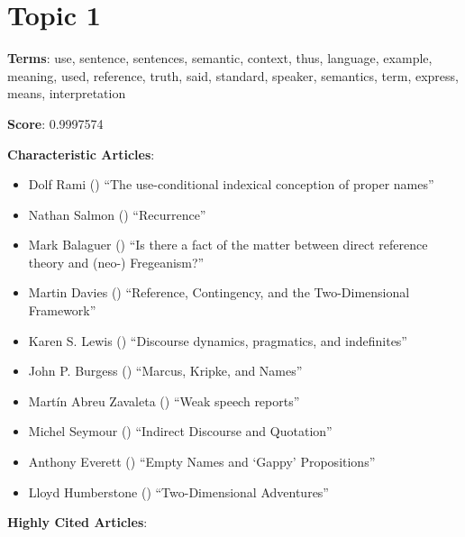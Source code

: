\documentclass[
  10pt,
  letterpaper,
  DIV=11,
  numbers=noendperiod,
  twoside]{scrartcl}
\providecommand{\tightlist}{%
  \setlength{\itemsep}{0pt}\setlength{\parskip}{0pt}}\usepackage{longtable,booktabs,array}
\begin{document}
\section{Topic 1}\label{topic-1}

\textbf{Terms}: use, sentence, sentences, semantic, context, thus,
language, example, meaning, used, reference, truth, said, standard,
speaker, semantics, term, express, means, interpretation

\textbf{Score}: 0.9997574

\textbf{Characteristic Articles}:

\begin{itemize}
\tightlist
\item
  Dolf Rami () ``The
  use-conditional indexical conception of proper names''
\item
  Nathan Salmon () ``Recurrence''
\item
  Mark Balaguer () ``Is there a
  fact of the matter between direct reference theory and (neo-)
  Fregeanism?''
\item
  Martin Davies () ``Reference,
  Contingency, and the Two-Dimensional Framework''
\item
  Karen S. Lewis () ``Discourse
  dynamics, pragmatics, and indefinites''
\item
  John P. Burgess () ``Marcus,
  Kripke, and Names''
\item
  Martín Abreu Zavaleta () ``Weak
  speech reports''
\item
  Michel Seymour () ``Indirect
  Discourse and Quotation''
\item
  Anthony Everett () ``Empty
  Names and `Gappy' Propositions''
\item
  Lloyd Humberstone ()
  ``Two-Dimensional Adventures''
\end{itemize}

\textbf{Highly Cited Articles}:
\end{document}
